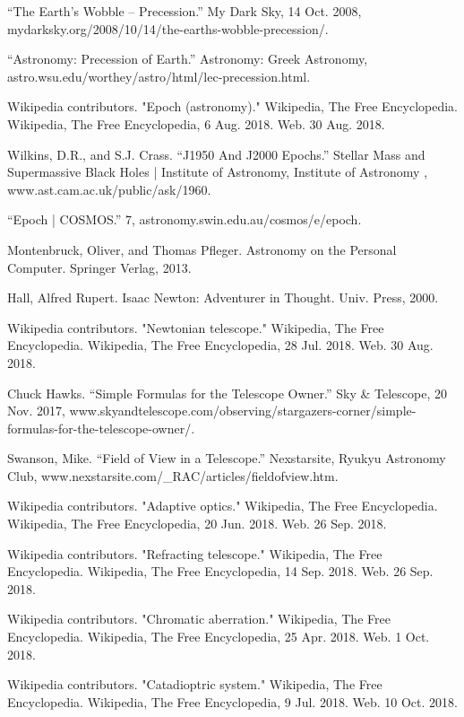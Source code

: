 \documentclass[a4paper,twoside]{article}
\numberwithin{equation}{section}
\begin{document}
\begin{thebibliography}{20}
“The Earth's Wobble – Precession.” My Dark Sky, 14 Oct. 2008, mydarksky.org/2008/10/14/the-earths-wobble-precession/.

“Astronomy: Precession of Earth.” Astronomy: Greek Astronomy, astro.wsu.edu/worthey/astro/html/lec-precession.html.

Wikipedia contributors. "Epoch (astronomy)." Wikipedia, The Free Encyclopedia. Wikipedia, The Free Encyclopedia, 6 Aug. 2018. Web. 30 Aug. 2018.

Wilkins, D.R., and S.J. Crass. “J1950 And J2000 Epochs.” Stellar Mass and Supermassive Black Holes | Institute of Astronomy, Institute of Astronomy , www.ast.cam.ac.uk/public/ask/1960.

“Epoch | COSMOS.” 7, astronomy.swin.edu.au/cosmos/e/epoch.

Montenbruck, Oliver, and Thomas Pfleger. Astronomy on the Personal Computer. Springer Verlag, 2013.

Hall, Alfred Rupert. Isaac Newton: Adventurer in Thought. Univ. Press, 2000.

Wikipedia contributors. "Newtonian telescope." Wikipedia, The Free Encyclopedia. Wikipedia, The Free Encyclopedia, 28 Jul. 2018. Web. 30 Aug. 2018.

Chuck Hawks. “Simple Formulas for the Telescope Owner.” Sky \& Telescope, 20 Nov. 2017, www.skyandtelescope.com/observing/stargazers-corner/simple-formulas-for-the-telescope-owner/.

Swanson, Mike. “Field of View in a Telescope.” Nexstarsite, Ryukyu Astronomy Club, www.nexstarsite.com/\_RAC/articles/fieldofview.htm.

Wikipedia contributors. "Adaptive optics." Wikipedia, The Free Encyclopedia. Wikipedia, The Free Encyclopedia, 20 Jun. 2018. Web. 26 Sep. 2018.

Wikipedia contributors. "Refracting telescope." Wikipedia, The Free Encyclopedia. Wikipedia, The Free Encyclopedia, 14 Sep. 2018. Web. 26 Sep. 2018.

Wikipedia contributors. "Chromatic aberration." Wikipedia, The Free Encyclopedia. Wikipedia, The Free Encyclopedia, 25 Apr. 2018. Web. 1 Oct. 2018.

Wikipedia contributors. "Catadioptric system." Wikipedia, The Free Encyclopedia. Wikipedia, The Free Encyclopedia, 9 Jul. 2018. Web. 10 Oct. 2018.


\end{thebibliography}
\end{document}
